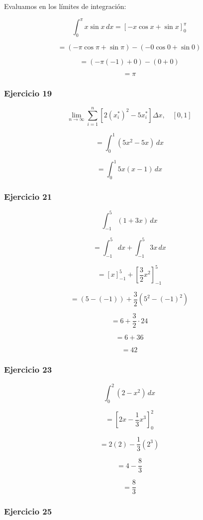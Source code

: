 Evaluamos en los límites de integración:

\[
\int_{0}^{\pi} x \sin x \,dx = \left[ -x \cos x + \sin x \right]_{0}^{\pi}
\]

\[
= \left( -\pi \cos \pi + \sin \pi \right) - \left( -0 \cos 0 + \sin 0 \right)
\]

\[
= (-\pi (-1) + 0) - (0 + 0)
\]

\[
= \pi
\]

\subsubsection*{Ejercicio 19}

\[
\lim_{n \to \infty} \sum_{i=1}^{n} \left[ 2(x_i^*)^2 - 5x_i^* \right] \Delta x, \quad [0,1]
\]

\[
= \int_{0}^{1} (5x^2 - 5x) \,dx
\]

\[
= \int_{0}^{1} 5x(x - 1) \,dx
\]

\subsubsection*{Ejercicio 21}

\[
\int_{-1}^{5} (1 + 3x) \,dx
\]

\[
= \int_{-1}^{5} dx + \int_{-1}^{5} 3x \,dx
\]

\[
= \left[ x \right]_{-1}^{5} + \left[ \frac{3}{2} x^2 \right]_{-1}^{5}
\]

\[
= (5 - (-1)) + \frac{3}{2} \left( 5^2 - (-1)^2 \right)
\]

\[
= 6 + \frac{3}{2} \cdot 24
\]

\[
= 6 + 36
\]

\[
= 42
\]


\subsubsection*{Ejercicio 23}

\[
\int_{0}^{2} (2 - x^2) \,dx
\]

\[
= \left[ 2x - \frac{1}{3}x^3 \right]_{0}^{2}
\]

\[
= 2(2) - \frac{1}{3} (2^3)
\]

\[
= 4 - \frac{8}{3}
\]

\[
= \frac{8}{3}
\]

\subsubsection*{Ejercicio 25}

